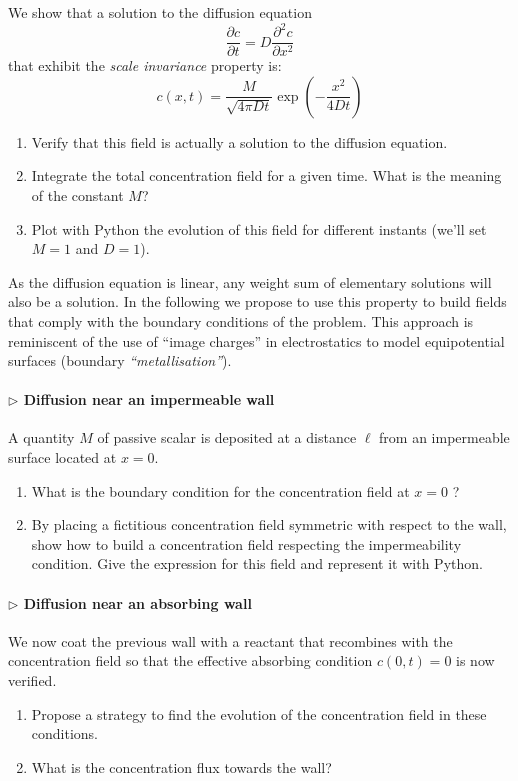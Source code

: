 \documentclass[11pt,a4paper]{article}
\newcommand{\lp}{\left(}
\newcommand{\rp}{\right)}
\newcommand{\pd}[2]{\frac{\partial #1}{\partial #2}}
\begin{document}
We show that a solution to the diffusion equation
\begin{equation}
\pd{c}{t} = D \frac{\partial^2 c}{\partial x^2}
\end{equation}
that exhibit the \textit{scale invariance} property is:
\begin{equation}
c(x,t) = \frac{M}{\sqrt{4 \pi D t}} \exp\lp-\frac{x^2}{4 D t}\rp
\end{equation}
\begin{enumerate}
\item Verify that this field is actually a solution to the diffusion equation.
\item Integrate the total concentration field for a given time. What is the meaning of the constant $M$?
\item Plot with Python the evolution of this field for different instants (we'll set $M = 1$ and $D = 1$).
\end{enumerate}
\vspace{2mm}

As the diffusion equation is linear, any weight sum of elementary solutions will also be a solution. In the following we propose to use this property to build fields that comply with the boundary conditions of the problem. This approach is reminiscent of the use of ``image charges'' in electrostatics to model equipotential surfaces (boundary \textit{``metallisation''}).
\paragraph{$\rhd$ Diffusion near an impermeable wall}
A quantity $M$ of passive scalar is deposited at a distance $\ell$ from an impermeable surface located at $x = 0$. 
\begin{enumerate}[resume]
\item What is the boundary condition for the concentration field at $x = 0$ ?
\item By placing a fictitious concentration field symmetric with respect to the wall, show how to build a concentration field respecting the impermeability condition. Give the expression for this field and represent it with Python.
\end{enumerate}
\paragraph{$\rhd$ Diffusion near an absorbing wall}
We now coat the previous wall with a reactant that recombines with the concentration field so that the effective absorbing condition $c(0,t) = 0$ is now verified.
\begin{enumerate}[resume]
\item Propose a strategy to find the evolution of the concentration field in these conditions.
\item What is the concentration flux towards the wall? 
\end{enumerate}
\end{document}
